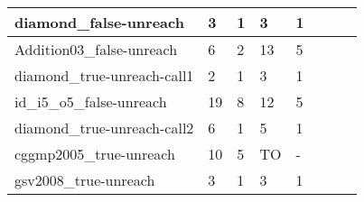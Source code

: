 \begin{table}
{\begin{tabular}{|l|l|l|l|l|l|l|}
    diamond\_false-unreach                                   & 3                                     & 1                                          & 3                                     & 1                                          & ~                                                               & ~                                        \\ \hline
    Addition03\_false-unreach                                & 6                                     & 2                                          & 13                                    & 5                                          & ~                                                               & ~                                        \\ \hline
    diamond\_true-unreach-call1                              & 2                                     & 1                                          & 3                                     & 1                                          & ~                                                               & ~                                        \\ \hline
    id\_i5\_o5\_false-unreach                                & 19                                    & 8                                          & 12                                    & 5                                          & ~                                                               & ~                                        \\ \hline
    diamond\_true-unreach-call2                              & 6                                     & 1                                          & 5                                     & 1                                          & ~                                                               & ~                                        \\ \hline
    cggmp2005\_true-unreach                                  & 10                                    & 5                                          & TO                                    & -                                          & ~                                                               & ~                                        \\ \hline
    gsv2008\_true-unreach                                    & 3                                     & 1                                          & 3                                     & 1                                          & ~                                                               & ~                                        \\ \hline

\end{tabular}}
\end{table}
